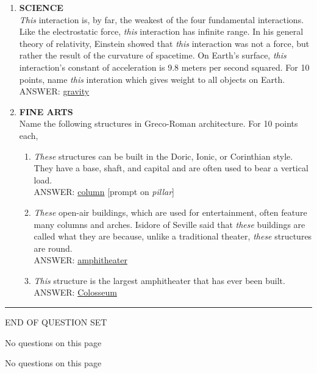 \documentclass{report}
\newcommand*{\backtrack}{\setcounter{enumi}{\numexpr\theenumi-1\relax}}
\begin{document}
\begin{enumerate}
    \item \textbf{SCIENCE} \\ \textit{This} interaction is, by far, the weakest of the four fundamental interactions. Like the electrostatic force, \textit{this} interaction has infinite range. In his general theory of relativity, Einstein showed that \textit{this} interaction was not a force, but rather the result of the curvature of spacetime. On Earth's surface, \textit{this} interaction's constant of acceleration is 9.8 meters per second squared. For 10 points, name \textit{this} interation which gives weight to all objects on Earth. \\ ANSWER: \underline{gravity} \backtrack
    \item \textbf{FINE ARTS} \\ Name the following structures in Greco-Roman architecture. For 10 points each,
    \begin{enumerate}[label=\Alph*]
        \item \textit{These} structures can be built in the Doric, Ionic, or Corinthian style. They have a base, shaft, and capital and are often used to bear a vertical load. \\ ANSWER: \underline{column} [prompt on \textit{pillar}]
        \item \textit{These} open-air buildings, which are used for entertainment, often feature many columns and arches. Isidore of Seville said that \textit{these} buildings are called what they are because, unlike a traditional theater, \textit{these} structures are round. \\ ANSWER: \underline{amphitheater}
        \item \textit{This} structure is the largest amphitheater that has ever been built. \\ ANSWER: \underline{Colosseum}
    \end{enumerate}

\end{enumerate}


\vspace*{0.5 cm}
\centering
\rule{10 cm}{0.4pt}

\Large
END OF QUESTION SET
\newpage

\vspace*{\fill}
\centering
\thispagestyle{empty}
\Large
No questions on this page
\vspace*{\fill}

\newpage

\vspace*{\fill}
\centering
\thispagestyle{empty}
\Large
No questions on this page
\vspace*{\fill}
\end{document}
